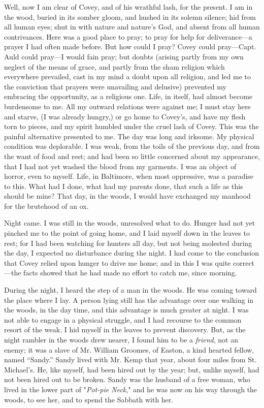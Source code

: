 Well, now I am clear of Covey, and of his wrathful lash, for the
present. I am in the wood, buried in its somber gloom, and hushed in its
solemn silence; hid from all human eyes; shut in with nature and
nature's God, and absent from all human contrivances. Here was a good
place to pray; to pray for help for deliverance---a prayer I had often
made before. But how could I pray? Covey could pray---Capt. Auld could
pray---I would fain pray; but doubts (arising
{\protect\hypertarget{235}{}{}}partly from my own neglect of the means
of grace, and partly from the sham religion which everywhere prevailed,
cast in my mind a doubt upon all religion, and led me to the conviction
that prayers were unavailing and delusive) prevented my embracing the
opportunity, as a religious one. Life, in itself, had almost become
burdensome to me. All my outward relations were against me; I must stay
here and starve, (I was already hungry,) or go home to Covey's, and have
my flesh torn to pieces, and my spirit humbled under the cruel lash of
Covey. This was the painful alternative presented to me. The day was
long and irksome. My physical condition was deplorable. I was weak, from
the toils of the previous day, and from the want of food and rest; and
had been so little concerned about my appearance, that I had not yet
washed the blood from my garments. I was an object of horror, even to
myself. Life, in Baltimore, when most oppressive, was a paradise to
this. What had I done, what had my parents done, that such a life as
this should be mine? That day, in the woods, I would have exchanged my
manhood for the brutehood of an ox.

Night came. I was still in the woods, unresolved what to do. Hunger had
not yet pinched me to the point of going home, and I laid myself down in
the leaves to rest; for I had been watching for hunters all day, but not
being molested during the day, I expected no disturbance during the
night. I had come to the conclusion that Covey relied upon hunger to
drive me home; and in this I was quite correct---the
{\protect\hypertarget{236}{}{}}facts showed that he had made no effort
to catch me, since morning.

During the night, I heard the step of a man in the woods. He was coming
toward the place where I lay. A person lying still has the advantage
over one walking in the woods, in the day time, and this advantage is
much greater at night. I was not able to engage in a physical struggle,
and I had recourse to the common resort of the weak. I hid myself in the
leaves to prevent discovery. But, as the night rambler in the woods drew
nearer, I found him to be a \emph{friend}, not an enemy; it was a slave
of Mr. William Groomes, of Easton, a kind hearted fellow, named
``Sandy.'' Sandy lived with Mr. Kemp that year, about four miles from
St. Michael's. He, like myself, had been hired out by the year; but,
unlike myself, had not been hired out to be broken. Sandy was the
husband of a free woman, who lived in the lower part of "\emph{Pot-pie
Neck}," and he was now on his way through the woods, to see her, and to
spend the Sabbath with her.


